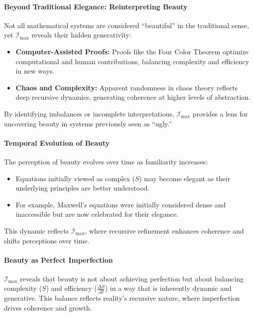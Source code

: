 \documentclass[12pt]{article}
\begin{document}
\paragraph{Beyond Traditional Elegance: Reinterpreting Beauty}
Not all mathematical systems are considered “beautiful” in the traditional sense, yet \(\mathcal{I}_{\text{max}}\) reveals their hidden generativity:
\begin{itemize}
    \item \textbf{Computer-Assisted Proofs:} Proofs like the Four Color Theorem optimize computational and human contributions, balancing complexity and efficiency in new ways.
    \item \textbf{Chaos and Complexity:} Apparent randomness in chaos theory reflects deep recursive dynamics, generating coherence at higher levels of abstraction.
\end{itemize}
By identifying imbalances or incomplete interpretations, \(\mathcal{I}_{\text{max}}\) provides a lens for uncovering beauty in systems previously seen as “ugly.”

\paragraph{Temporal Evolution of Beauty}
The perception of beauty evolves over time as familiarity increases:
\begin{itemize}
    \item Equations initially viewed as complex (\(S\)) may become elegant as their underlying principles are better understood.
    \item For example, Maxwell’s equations were initially considered dense and inaccessible but are now celebrated for their elegance.
\end{itemize}
This dynamic reflects \(\mathcal{I}_{\text{max}}\), where recursive refinement enhances coherence and shifts perceptions over time.

\paragraph{Beauty as Perfect Imperfection}
\(\mathcal{I}_{\text{max}}\) reveals that beauty is not about achieving perfection but about balancing complexity (\(S\)) and efficiency (\(\frac{\Delta S}{\Delta t}\)) in a way that is inherently dynamic and generative. This balance reflects reality’s recursive nature, where imperfection drives coherence and growth.
\end{document}
